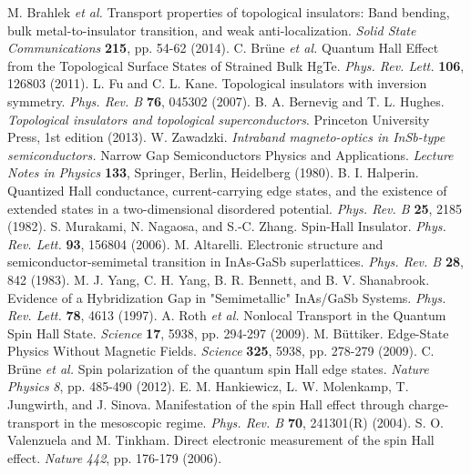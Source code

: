 \documentclass[titlepage,a4paper]{book}
\begin{document}
\begin{thebibliography}{199}
M. Brahlek \textit{et al.} Transport properties of topological insulators: Band bending, bulk metal-to-insulator transition, and weak anti-localization. \textit{Solid State Communications} \textbf{215}, pp. 54-62 (2014).
C. Brüne \textit{et al.} Quantum Hall Effect from the Topological Surface States of Strained Bulk HgTe. \textit{Phys. Rev. Lett.} \textbf{106}, 126803 (2011).
L. Fu and C. L. Kane. Topological insulators with inversion symmetry. \textit{Phys. Rev. B} \textbf{76}, 045302 (2007).
B. A. Bernevig and T. L. Hughes. \textit{Topological insulators and topological superconductors}. Princeton University Press, 1st edition (2013).
W. Zawadzki. \textit{Intraband magneto-optics in InSb-type semiconductors.} Narrow Gap Semiconductors Physics and Applications. \textit{Lecture Notes in Physics} \textbf{133}, Springer, Berlin, Heidelberg (1980).
B. I. Halperin. Quantized Hall conductance, current-carrying edge states, and the existence of extended states in a two-dimensional disordered potential. \textit{Phys. Rev. B} \textbf{25}, 2185 (1982).
S. Murakami, N. Nagaosa, and S.-C. Zhang. Spin-Hall Insulator. \textit{Phys. Rev. Lett.} \textbf{93}, 156804 (2006).
M. Altarelli. Electronic structure and semiconductor-semimetal transition in InAs-GaSb superlattices. \textit{Phys. Rev. B} \textbf{28}, 842 (1983).
M. J. Yang, C. H. Yang, B. R. Bennett, and B. V. Shanabrook. Evidence of a Hybridization Gap in "Semimetallic" InAs/GaSb Systems. \textit{Phys. Rev. Lett.} \textbf{78}, 4613 (1997).
A. Roth  \textit{et al.} Nonlocal Transport in the Quantum Spin Hall State. \textit{Science} \textbf{17}, 5938, pp. 294-297 (2009).
M. Büttiker. Edge-State Physics Without Magnetic Fields. \textit{Science} \textbf{325}, 5938, pp. 278-279 (2009).
C. Brüne \textit{et al.} Spin polarization of the quantum spin Hall edge states. \textit{Nature Physics} \textit{8}, pp. 485-490 (2012).
E. M. Hankiewicz, L. W. Molenkamp, T. Jungwirth, and J. Sinova. Manifestation of the spin Hall effect through charge-transport in the mesoscopic regime. \textit{Phys. Rev. B} \textbf{70}, 241301(R) (2004).  
S. O. Valenzuela and M. Tinkham. Direct electronic measurement of the spin Hall effect. \textit{Nature} \textit{442}, pp. 176-179 (2006).

\end{thebibliography}
\end{document}

